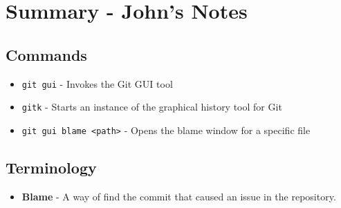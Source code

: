 \clearpage

\section{Summary - John's Notes}
\subsection{Commands}
\begin{itemize}

\item\texttt{git gui} - Invokes the Git GUI tool

\item\texttt{gitk} - Starts an instance of the graphical history tool for Git

\item\texttt{git gui blame <path>} - Opens the blame window for a specific file

\end{itemize}

\subsection{Terminology}
\begin{itemize}

\item\textbf{Blame} - A way of find the commit that caused an issue in the repository.
\end{itemize}
